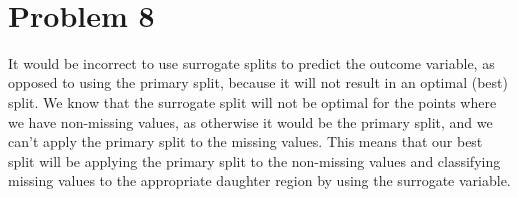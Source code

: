 \documentclass[11pt]{article}
\begin{document}
\begin{center}

\ \\
\end{center}

\section*{Problem 8}

\vspace{5 mm}
\noindent
It would be incorrect to use surrogate splits to predict the outcome variable, 
as opposed to using the primary split, because it will not result in an optimal 
(best) split.  We know that the surrogate split will not be optimal for the 
points where we have non-missing values, as otherwise it would be the primary 
split, and we can't apply the primary split to the missing values.  This means 
that our best split will be applying the primary split to the non-missing 
values and classifying missing values to the appropriate daughter region by 
using the surrogate variable.
\end{document}

